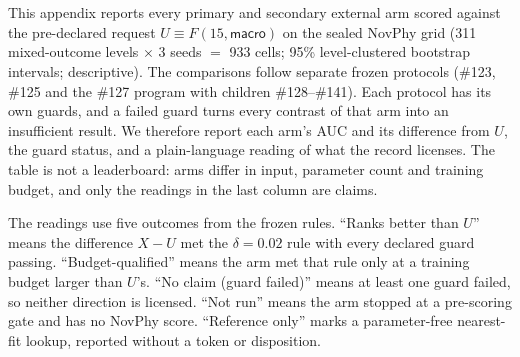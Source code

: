 \section{\texorpdfstring{}{Direct Predictors and External Baselines}}
\label{sec:app:external}

\begin{revblock}
\nopagebreak
This appendix reports every primary and secondary external arm scored against the pre-declared request $U\equiv F(15,\textsf{macro})$ on the sealed NovPhy grid (311 mixed-outcome levels $\times$ 3 seeds $=$ 933 cells; 95\% level-clustered bootstrap intervals; descriptive). The comparisons follow separate frozen protocols (\#123, \#125 and the \#127 program with children \#128--\#141). Each protocol has its own guards, and a failed guard turns every contrast of that arm into an insufficient result. We therefore report each arm's AUC and its difference from $U$, the guard status, and a plain-language reading of what the record licenses. The table is not a leaderboard: arms differ in input, parameter count and training budget, and only the readings in the last column are claims.

The readings use five outcomes from the frozen rules. ``Ranks better than $U$'' means the difference $X-U$ met the $\delta=0.02$ rule with every declared guard passing. ``Budget-qualified'' means the arm met that rule only at a training budget larger than $U$'s. ``No claim (guard failed)'' means at least one guard failed, so neither direction is licensed. ``Not run'' means the arm stopped at a pre-scoring gate and has no NovPhy score. ``Reference only'' marks a parameter-free nearest-fit lookup, reported without a token or disposition.
\end{revblock}

\subsection{\texorpdfstring{}{Scored arms}}
\label{sec:app:ext:scored}

